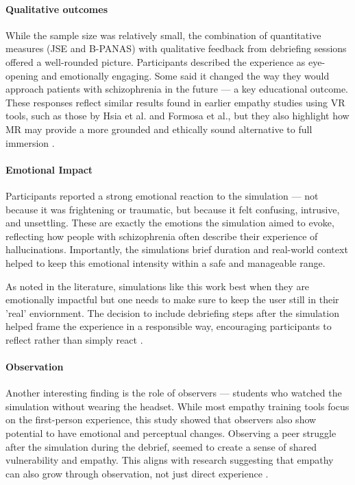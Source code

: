 \paragraph{Qualitative outcomes}
While the sample size was relatively small, the combination of quantitative measures (JSE and B-PANAS) with qualitative feedback from debriefing sessions offered a well-rounded picture. Participants described the experience as eye-opening and emotionally engaging. Some said it changed the way they would approach patients with schizophrenia in the future — a key educational outcome. These responses reflect similar results found in earlier empathy studies using VR tools, such as those by Hsia et al. and Formosa et al., but they also highlight how MR may provide a more grounded and ethically sound alternative to full immersion \cite{Hsia2022, Formosa2018}.

\paragraph{Emotional Impact}

Participants reported a strong emotional reaction to the simulation — not because it was frightening or traumatic, but because it felt confusing, intrusive, and unsettling. These are exactly the emotions the simulation aimed to evoke, reflecting how people with schizophrenia often describe their experience of hallucinations. Importantly, the simulations brief duration and real-world context helped to keep this emotional intensity within a safe and manageable range.

\vspace{1em}

As noted in the literature, simulations like this work best when they are emotionally impactful but one needs to make sure to keep the user still in their 'real' enviornment. The decision to include debriefing steps after the simulation helped frame the experience in a responsible way, encouraging participants to reflect rather than simply react \cite{Rueda2020, Ando2011}.

\paragraph{Observation}

Another interesting finding is the role of observers — students who watched the simulation without wearing the headset. While most empathy training tools focus on the first-person experience, this study showed that observers also show potential to have  emotional and perceptual changes. Observing a peer struggle after the simulation during the debrief, seemed to create a sense of shared vulnerability and empathy. This aligns with research suggesting that empathy can also grow through observation, not just direct experience \cite{Formosa2018}.
\vspace{1em}

